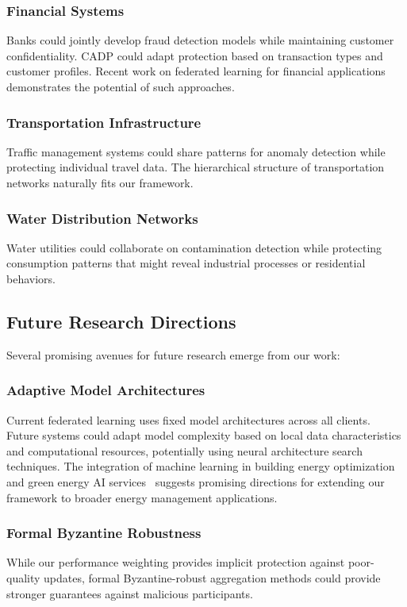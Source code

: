 \documentclass{ieeeaccess}
\theoremstyle{definition}
\begin{document}
\subsubsection{Financial Systems}
Banks could jointly develop fraud detection models while maintaining customer confidentiality. CADP could adapt protection based on transaction types and customer profiles. Recent work on federated learning for financial applications \cite{xia2025fingraphfl} demonstrates the potential of such approaches.

\subsubsection{Transportation Infrastructure}
Traffic management systems could share patterns for anomaly detection while protecting individual travel data. The hierarchical structure of transportation networks naturally fits our framework.

\subsubsection{Water Distribution Networks}
Water utilities could collaborate on contamination detection while protecting consumption patterns that might reveal industrial processes or residential behaviors.

\subsection{Future Research Directions}

Several promising avenues for future research emerge from our work:

\subsubsection{Adaptive Model Architectures}
Current federated learning uses fixed model architectures across all clients. Future systems could adapt model complexity based on local data characteristics and computational resources, potentially using neural architecture search techniques. The integration of machine learning in building energy optimization~\cite{liu2025applications} and green energy AI services~\cite{mehta2023review} suggests promising directions for extending our framework to broader energy management applications.

\subsubsection{Formal Byzantine Robustness}
While our performance weighting provides implicit protection against poor-quality updates, formal Byzantine-robust aggregation methods could provide stronger guarantees against malicious participants.
\end{document}
